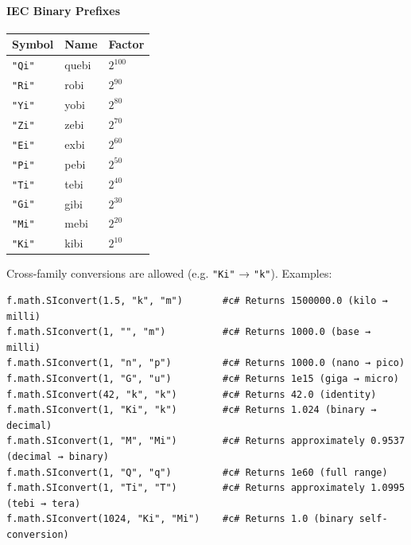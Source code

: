 \paragraph{IEC Binary Prefixes}
\begin{table}[h]
\centering
\footnotesize
\begin{tabular}{|l|l|l|}
\hline
\textbf{Symbol} & \textbf{Name} & \textbf{Factor} \\
\hline
\texttt{"Qi"} & quebi & $2^{100}$ \\
\texttt{"Ri"} & robi & $2^{90}$ \\
\texttt{"Yi"} & yobi & $2^{80}$ \\
\texttt{"Zi"} & zebi & $2^{70}$ \\
\texttt{"Ei"} & exbi & $2^{60}$ \\
\texttt{"Pi"} & pebi & $2^{50}$ \\
\texttt{"Ti"} & tebi & $2^{40}$ \\
\texttt{"Gi"} & gibi & $2^{30}$ \\
\texttt{"Mi"} & mebi & $2^{20}$ \\
\texttt{"Ki"} & kibi & $2^{10}$ \\
\hline
\end{tabular}
\end{table}

Cross-family conversions are allowed (e.g. \texttt{"Ki"} → \texttt{"k"}). Examples:
\begin{verbatim}
f.math.SIconvert(1.5, "k", "m")       #c# Returns 1500000.0 (kilo → milli)
f.math.SIconvert(1, "", "m")          #c# Returns 1000.0 (base → milli)
f.math.SIconvert(1, "n", "p")         #c# Returns 1000.0 (nano → pico)
f.math.SIconvert(1, "G", "u")         #c# Returns 1e15 (giga → micro)
f.math.SIconvert(42, "k", "k")        #c# Returns 42.0 (identity)
f.math.SIconvert(1, "Ki", "k")        #c# Returns 1.024 (binary → decimal)
f.math.SIconvert(1, "M", "Mi")        #c# Returns approximately 0.9537 (decimal → binary)
f.math.SIconvert(1, "Q", "q")         #c# Returns 1e60 (full range)
f.math.SIconvert(1, "Ti", "T")        #c# Returns approximately 1.0995 (tebi → tera)
f.math.SIconvert(1024, "Ki", "Mi")    #c# Returns 1.0 (binary self-conversion)
\end{verbatim}

